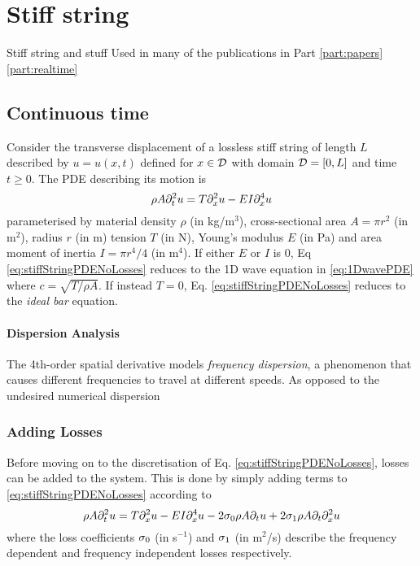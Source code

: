 \chapter{Stiff string}\label{ch:stiffString}

Stiff string and stuff
Used in many of the publications in Part \ref{part:papers}
\ref{part:realtime}

\section{Continuous time}
Consider the transverse displacement of a lossless stiff string of length $L$ described by $u=u(x,t)$ defined for $x\in \mathcal{D}$ with domain $\mathcal{D} = [0, L]$ and time $t\geq 0$. The PDE describing its motion is 
\begin{equation}\label{eq:stiffStringPDENoLosses}
    \rho A \partial_t^2 u = T \partial_x^2 u - EI \partial_x^4 u
\end{equation}
parameterised by material density $\rho$ (in kg/m$^3$), cross-sectional area $A = \pi r^2$ (in m$^2$), radius $r$ (in m) tension $T$ (in N), Young's modulus $E$ (in Pa) and area moment of inertia $I = \pi r^4/4$ (in m$^4$). If either $E$ or $I$ is 0, Eq \eqref{eq:stiffStringPDENoLosses} reduces to the 1D wave equation in \eqref{eq:1DwavePDE} where $c = \sqrt{T/\rho A}$. If instead $T = 0$, Eq. \eqref{eq:stiffStringPDENoLosses} reduces to the \textit{ideal bar} equation.


\subsubsection{Dispersion Analysis}
The 4th-order spatial derivative models \textit{frequency dispersion}, a phenomenon that causes different frequencies to travel at different speeds. As opposed to the undesired numerical dispersion 

\subsection{Adding Losses}
Before moving on to the discretisation of Eq. \eqref{eq:stiffStringPDENoLosses}, losses can be added to the system. This is done by simply adding terms to \eqref{eq:stiffStringPDENoLosses} according to 
\begin{equation}\label{eq:stiffStringPDE}
    \rho A \partial_t^2 u = T \partial_x^2 u - EI \partial_x^4 u - 2 \sigma_{0} \rho A \partial_t u + 2 \sigma_{1} \rho A\partial_t \partial_x^2 u
\end{equation}
where the loss coefficients $\sigma_{0}$ (in s$^{-1}$) and $\sigma_{1}$ (in m$^2$/s) describe the frequency dependent and frequency independent losses respectively. 

